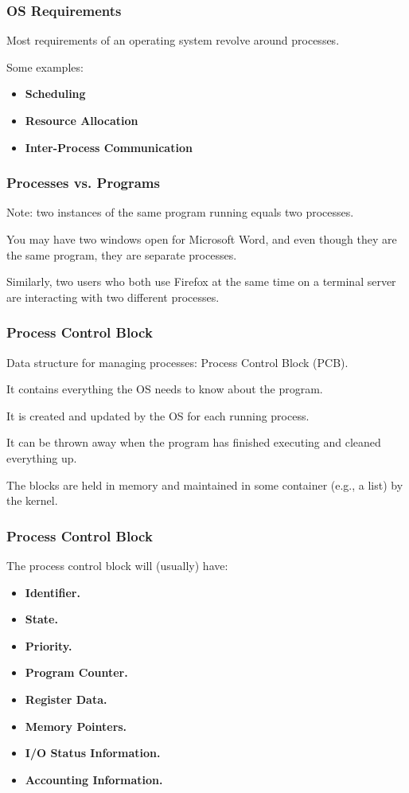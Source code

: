 \begin{frame}
\frametitle{OS Requirements}

Most requirements of an operating system revolve around processes.

Some examples: 
\begin{itemize}
	\item \textbf{Scheduling} 
	\item \textbf{Resource Allocation}
	\item \textbf{Inter-Process Communication}
\end{itemize}

\end{frame}

\begin{frame}
\frametitle{Processes vs. Programs}

Note: two instances of the same program running equals two processes. 

You may have two windows open for Microsoft Word, and even though they are the same program, they are separate processes. 

Similarly, two users who both use Firefox at the same time on a terminal server are interacting with two different processes.

\end{frame}

\begin{frame}
\frametitle{Process Control Block}

Data structure for managing processes: \alert{Process Control Block} (PCB). 

It contains everything the OS needs to know about the program. 

It is created and updated by the OS for each running process.

It can be thrown away when the program has finished executing and cleaned everything up. 

The blocks are held in memory and maintained in some container (e.g., a list) by the kernel.



\end{frame}

\begin{frame}
\frametitle{Process Control Block}

The process control block will (usually) have:
\begin{itemize}
	\item \textbf{Identifier.} 
	\item \textbf{State.} 
	\item \textbf{Priority.} 
	\item \textbf{Program Counter.}
	\item \textbf{Register Data.} 
	\item \textbf{Memory Pointers.}
	\item \textbf{I/O Status Information.} 
	\item \textbf{Accounting Information.} 
\end{itemize}

\end{frame}


